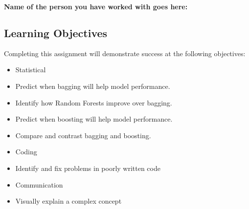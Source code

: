 \documentclass[11pt]{article}
\providecommand{\tightlist}{%
      \setlength{\itemsep}{0pt}\setlength{\parskip}{0pt}}
\begin{document}
\textbf{Name of the person you have worked with goes here:} 

    \subsection{Learning Objectives}\label{learning-objectives}

Completing this assignment will demonstrate success at the following
objectives:

\begin{itemize}
\tightlist
\item
  Statistical
\item
  Predict when bagging will help model performance.
\item
  Identify how Random Forests improve over bagging.
\item
  Predict when boosting will help model performance.
\item
  Compare and contrast bagging and boosting.
\item
  Coding
\item
  Identify and fix problems in poorly written code
\item
  Communication
\item
  Visually explain a complex concept
\end{itemize}
\end{document}
